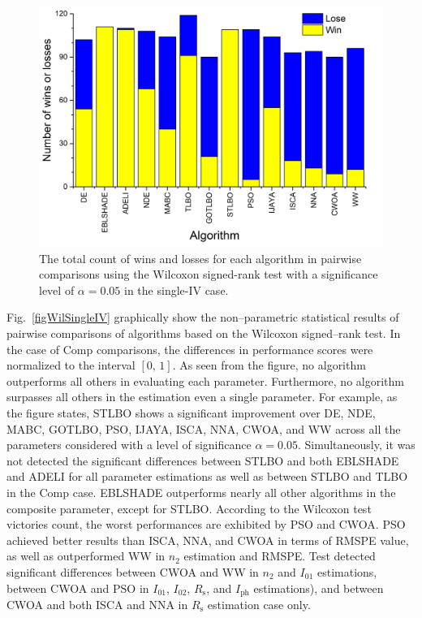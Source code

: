 \documentclass[a4paper,fleqn]{cas-dc}
\begin{document}
\begin{figure}[]
	\centering
		\includegraphics[width=1.0\columnwidth]{Fig5}
	  \caption{The total count of wins and losses for each algorithm in pairwise comparisons using the
               Wilcoxon signed-rank test with a significance level of $\alpha = 0.05$ in the single-IV case.}\label{figWilTotSingleIV}
\end{figure}




Fig.~\ref{figWilSingleIV} graphically show
the non--parametric statistical results of pairwise comparisons of algorithms
based on the Wilcoxon signed--rank test.
In the case of Comp comparisons, the differences in performance scores
were normalized to the interval $[0,\, 1]$.
As seen from the figure, no algorithm outperforms all others in evaluating each parameter.
Furthermore, no algorithm surpasses all others in the estimation even a single parameter.
For example, as the figure states, STLBO shows a significant improvement over
DE, NDE, MABC, GOTLBO, PSO, IJAYA, ISCA, NNA, CWOA, and WW across all the parameters considered
with a level of significance $\alpha = 0.05$.
Simultaneously, it was not detected the significant differences
between STLBO and both EBLSHADE and ADELI for all parameter estimations
as well as between STLBO and TLBO in the Comp case.
EBLSHADE outperforms nearly all other algorithms in the composite parameter, except for STLBO.
According to the Wilcoxon test victories count,
the worst performances are exhibited by PSO and CWOA.
PSO achieved better results than ISCA, NNA, and CWOA in terms of RMSPE value,
as well as outperformed WW in $n_2$ estimation and RMSPE.
Test detected significant differences between CWOA and WW in $n_2$ and $I_{01}$ estimations,
between CWOA and PSO in $I_{01}$, $I_{02}$, $R_\mathrm{s}$, and $I_\mathrm{ph}$ estimations),
and between CWOA and both ISCA and NNA in $R_\mathrm{s}$  estimation case only.
\end{document}
